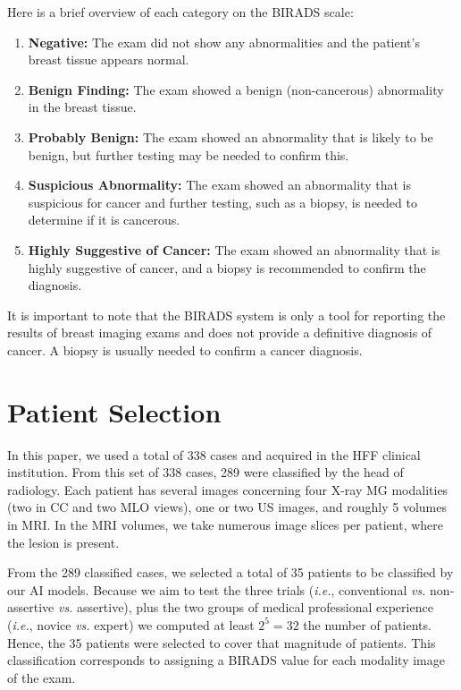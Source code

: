 \noindent
Here is a brief overview of each category on the BIRADS scale:

\vspace{0.5mm}

\begin{enumerate}
\item {\bf Negative:} The exam did not show any abnormalities and the patient's breast tissue appears normal.
\item {\bf Benign Finding:} The exam showed a benign (non-cancerous) abnormality in the breast tissue.
\item {\bf Probably Benign:} The exam showed an abnormality that is likely to be benign, but further testing may be needed to confirm this.
\item {\bf Suspicious Abnormality:} The exam showed an abnormality that is suspicious for cancer and further testing, such as a biopsy, is needed to determine if it is cancerous.
\item {\bf Highly Suggestive of Cancer:} The exam showed an abnormality that is highly suggestive of cancer, and a biopsy is recommended to confirm the diagnosis.
\end{enumerate}

\vspace{0.5mm}

It is important to note that the BIRADS system is only a tool for reporting the results of breast imaging exams and does not provide a definitive diagnosis of cancer. A biopsy is usually needed to confirm a cancer diagnosis.

\section{Patient Selection}
\label{sec:app001002}

In this paper, we used a total of 338 cases and acquired in the HFF clinical institution.
From this set of 338 cases, 289 were classified by the head of radiology.
Each patient has several images concerning four X-ray MG modalities (two in CC and two MLO views), one or two US images, and roughly 5 volumes in MRI.
In the MRI volumes, we take numerous image slices per patient, where the lesion is present.

From the 289 classified cases, we selected a total of 35 patients to be classified by our AI models.
Because we aim to test the three trials ({\it i.e.}, conventional {\it vs.} non-assertive {\it vs.} assertive), plus the two groups of medical professional experience ({\it i.e.}, novice {\it vs.} expert) we computed at least $2^5=32$ the number of patients.
Hence, the 35 patients were selected to cover that magnitude of patients.
This classification corresponds to assigning a BIRADS value for each modality image of the exam.

